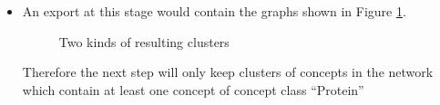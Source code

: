 \begin{itemize}
\item An export at this stage would contain the graphs shown in Figure \ref{fig:clusters}.
\begin{figure}[H]
\centering
{}
\label{fig:clusters}
\caption{Two kinds of resulting clusters}
\end{figure}
Therefore the next step will only keep clusters of concepts in the network which contain at least one concept of concept class ``Protein'' 

\end{itemize}
